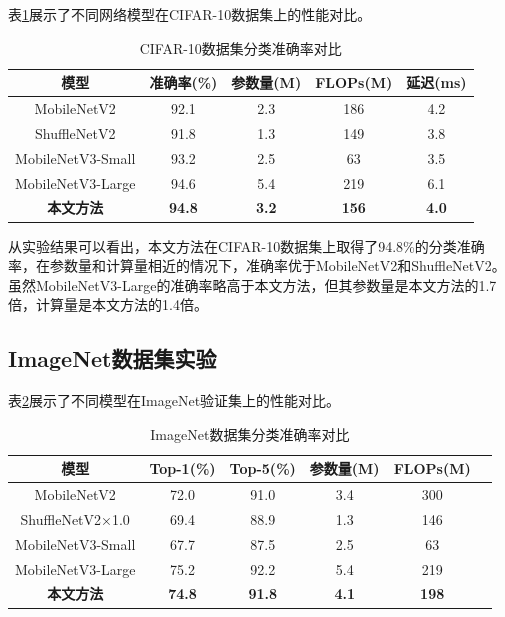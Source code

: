 表\ref{tab:cifar10_results}展示了不同网络模型在CIFAR-10数据集上的性能对比。

\begin{table}[htbp]
    \centering
    \caption{CIFAR-10数据集分类准确率对比}
    \begin{tabular}{ccccc}
        \toprule
        \textbf{模型} & \textbf{准确率(\%)} & \textbf{参数量(M)} & \textbf{FLOPs(M)} & \textbf{延迟(ms)} \\
        \midrule
        MobileNetV2 & 92.1 & 2.3 & 186 & 4.2 \\
        ShuffleNetV2 & 91.8 & 1.3 & 149 & 3.8 \\
        MobileNetV3-Small & 93.2 & 2.5 & 63 & 3.5 \\
        MobileNetV3-Large & 94.6 & 5.4 & 219 & 6.1 \\
        \textbf{本文方法} & \textbf{94.8} & \textbf{3.2} & \textbf{156} & \textbf{4.0} \\
        \bottomrule
    \end{tabular}
    \label{tab:cifar10_results}
\end{table}

从实验结果可以看出，本文方法在CIFAR-10数据集上取得了94.8\%的分类准确率，在参数量和计算量相近的情况下，准确率优于MobileNetV2和ShuffleNetV2。虽然MobileNetV3-Large的准确率略高于本文方法，但其参数量是本文方法的1.7倍，计算量是本文方法的1.4倍。

\subsection{ImageNet数据集实验}

表\ref{tab:imagenet_results}展示了不同模型在ImageNet验证集上的性能对比。

\begin{table}[htbp]
    \centering
    \caption{ImageNet数据集分类准确率对比}
    \begin{tabular}{cccccc}
        \toprule
        \textbf{模型} & \textbf{Top-1(\%)} & \textbf{Top-5(\%)} & \textbf{参数量(M)} & \textbf{FLOPs(M)} \\
        \midrule
        MobileNetV2 & 72.0 & 91.0 & 3.4 & 300 \\
        ShuffleNetV2×1.0 & 69.4 & 88.9 & 1.3 & 146 \\
        MobileNetV3-Small & 67.7 & 87.5 & 2.5 & 63 \\
        MobileNetV3-Large & 75.2 & 92.2 & 5.4 & 219 \\
        \textbf{本文方法} & \textbf{74.8} & \textbf{91.8} & \textbf{4.1} & \textbf{198} \\
        \bottomrule
    \end{tabular}
    \label{tab:imagenet_results}
\end{table}

